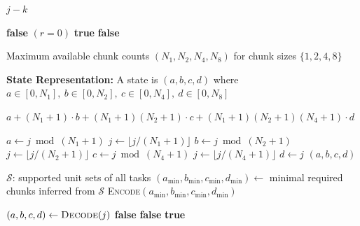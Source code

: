 \begin{algorithm}[t!]
\begin{footnotesize}
\begin{algorithmic}[1]
    \State \Return $j - k$
\EndFunction

        \State \Return \textbf{false}
    \EndIf
        \State \Return $(r = 0)$
    \EndIf
            \State \Return \textbf{true}
        \EndIf
    \EndFor
    \State \Return \textbf{false}
\EndFunction

\end{algorithmic}
\end{footnotesize}
\end{algorithm}


\begin{algorithm}[t!]
\caption{GPU-Topology-Aware DP Operator}

\label{alg:gpu_dp}
\label{alg:gpu_dp_operator}
\begin{footnotesize}
\begin{algorithmic}[1]

\Require
Maximum available chunk counts $(N_1, N_2, N_4, N_8)$ for chunk sizes $\{1,2,4,8\}$

\vspace{0.3em}
\Statex \textbf{State Representation:}
\Statex A state is $(a,b,c,d)$ where
\Statex $a \in [0,N_1],~b \in [0,N_2],~c \in [0,N_4],~d \in [0,N_8]$

\vspace{0.5em}
    \State \Return $a
    + (N_1+1)\cdot b
    + (N_1+1)(N_2+1)\cdot c
    + (N_1+1)(N_2+1)(N_4+1)\cdot d$
\EndFunction

\vspace{0.3em}
    \State $a \gets j \bmod (N_1+1)$
    \State $j \gets \lfloor j / (N_1+1) \rfloor$
    \State $b \gets j \bmod (N_2+1)$
    \State $j \gets \lfloor j / (N_2+1) \rfloor$
    \State $c \gets j \bmod (N_4+1)$
    \State $j \gets \lfloor j / (N_4+1) \rfloor$
    \State $d \gets j$
    \State \Return $(a,b,c,d)$
\EndFunction

\vspace{0.5em}
    \Statex $\mathcal{S}$: supported unit sets of all tasks
    \State $(a_{\min},b_{\min},c_{\min},d_{\min}) \gets$ minimal required chunks inferred from $\mathcal{S}$
    \State \Return \textsc{Encode}$(a_{\min},b_{\min},c_{\min},d_{\min})$
\EndFunction

\vspace{0.5em}
    \State $(a,b,c,d) \gets \textsc{Decode}(j)$
        \State \Return \textbf{false}
    \EndIf
        \State \Return \textbf{false}
    \EndIf
    \State \Return \textbf{true}
\EndFunction


\end{algorithmic}
\end{footnotesize}
\end{algorithm}
